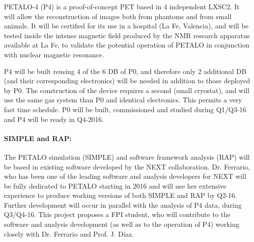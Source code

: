 PETALO-4 (P4) is a proof-of-concept PET based in 4 independent LXSC2. It will allow the reconstruction of images both from phantoms and from small animals. It will be certified for its use in a hospital (La Fe, Valencia), and will be tested inside the intense magnetic field produced by the NMR research apparatus available at La Fe, to validate the potential operation of PETALO in conjunction with nuclear magnetic resonance.  


P4 will be built reusing 4 of the 6 DB of P0, and therefore only 2 additional DB (and their corresponding electronics) will be needed in addition to those deployed by P0. The construction of the device requires a second (small cryostat), and will use the same gas system than P0 and identical electronics. This permits a very fast time schedule. P0 will be built, commissioned and studied during Q1/Q3-16 and P4 will be ready in Q4-2016. 

% 

\paragraph{SIMPLE and RAP:}
The PETALO simulation (SIMPLE) and software framework analysis (RAP) will be based in existing software developed by the NEXT collaboration. Dr. Ferrario, who has been one of the leading software and analysis developers for NEXT will be fully dedicated to PETALO starting in 2016 and will use her extensive experience to produce working versions of both SIMPLE and RAP by Q2-16. Further development will occur in parallel with the analysis of P4 data, during Q3/Q4-16. This project proposes a FPI student, who will contribute to the software and analysis development (as well as to the operation of P4) working closely with Dr. Ferrario and Prof. J. Díaz.

